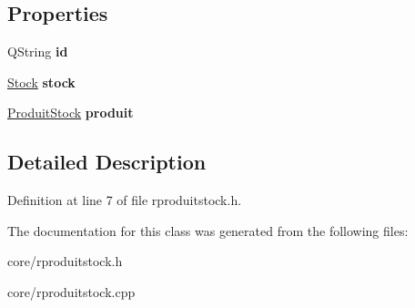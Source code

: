 \subsection*{Properties}
\begin{DoxyCompactItemize}
\item 
\hypertarget{class_r_produit_stock_a0959899355c4a60eb3e2620f02b5d0cb}{
QString {\bfseries id}}
\label{class_r_produit_stock_a0959899355c4a60eb3e2620f02b5d0cb}

\item 
\hypertarget{class_r_produit_stock_a99577c4b996b6e4ba004c39cf451ebc5}{
\hyperlink{class_stock}{Stock} {\bfseries stock}}
\label{class_r_produit_stock_a99577c4b996b6e4ba004c39cf451ebc5}

\item 
\hypertarget{class_r_produit_stock_a508086756c4ded5d2e92043a1db9c6a2}{
\hyperlink{class_produit_stock}{ProduitStock} {\bfseries produit}}
\label{class_r_produit_stock_a508086756c4ded5d2e92043a1db9c6a2}

\end{DoxyCompactItemize}


\subsection{Detailed Description}


Definition at line 7 of file rproduitstock.h.



The documentation for this class was generated from the following files:\begin{DoxyCompactItemize}
\item 
core/rproduitstock.h\item 
core/rproduitstock.cpp\end{DoxyCompactItemize}
